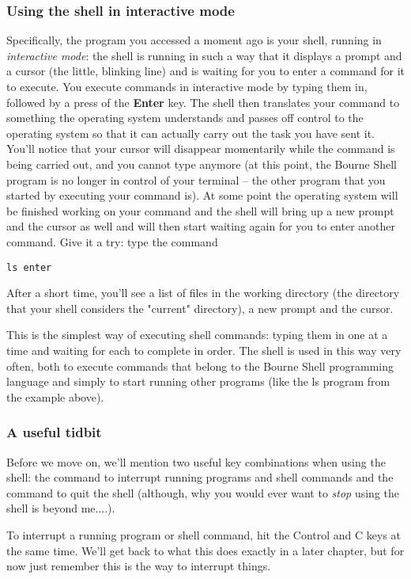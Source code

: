 \subsubsection{Using the shell in interactive mode}
Specifically, the program you accessed a moment ago is your shell, running in
\textit{interactive mode}: the shell is running in such a way that it displays
a prompt and a cursor (the little, blinking line) and is waiting for you to
enter a command for it to execute. You execute commands in interactive mode by
typing them in, followed by a press of the \textbf{Enter} key. The shell then
translates your command to something the operating system understands and
passes off control to the operating system so that it can actually carry out
the task you have sent it.  You'll notice that your cursor will disappear
momentarily while the command is being carried out, and you cannot type anymore
(at this point, the Bourne Shell program is no longer in control of your
terminal -- the other program that you started  by executing your command is).
At some point the operating system will be finished working on your command and
the shell will bring up a new prompt and the cursor as well and will then start
waiting again for you to enter another command. Give it a try: type the command
\scriptsize
\begin{verbatim}
ls enter
\end{verbatim}
\normalsize

After a short time, you'll see a list of files in the working directory (the
directory that your shell considers the "current" directory), a new prompt and
the cursor.

This is the simplest way of executing shell commands: typing them in one at a
time and waiting for each to complete in order. The shell is used in this way
very often, both to execute commands that belong to the Bourne Shell
programming language and simply to start running other programs (like the ls
program from the example above).

\subsubsection{A useful tidbit}
Before we move on, we'll mention two useful key combinations when using the
shell: the command to interrupt running programs and shell commands and the
command to quit the shell (although, why you would ever want to \textit{stop}
using the shell is beyond me....).

To interrupt a running program or shell command, hit the Control and C keys at
the same time. We'll get back to what this does exactly in a later chapter, but
for now just remember this is the way to interrupt things.

